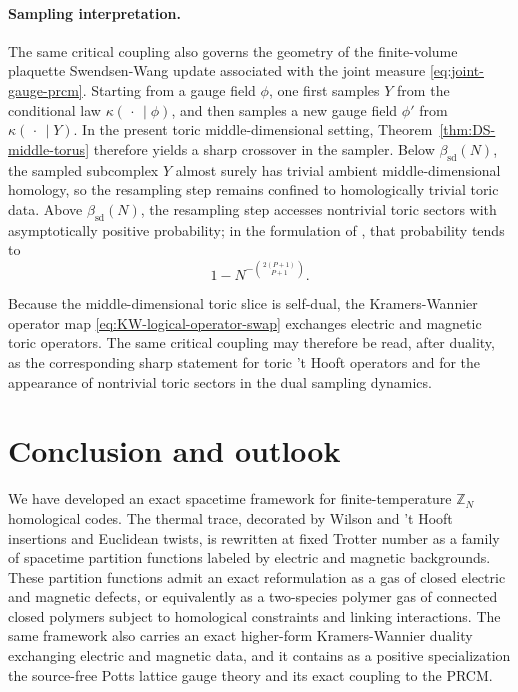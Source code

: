 \paragraph{Sampling interpretation.}
The same critical coupling also governs the geometry of the finite-volume
plaquette Swendsen-Wang update \cite{SwendsenWang87} associated with the joint measure
\eqref{eq:joint-gauge-prcm}. Starting from a gauge field \(\phi\), one first
samples \(Y\) from the conditional law \(\kappa(\,\cdot\,\mid \phi)\), and then
samples a new gauge field \(\phi'\) from \(\kappa(\,\cdot\,\mid Y)\). In the
present toric middle-dimensional setting, Theorem~\ref{thm:DS-middle-torus}
therefore yields a sharp crossover in the sampler. Below
\(\beta_{\mathrm{sd}}(N)\), the sampled subcomplex \(Y\) almost surely has
trivial ambient middle-dimensional homology, so the resampling step remains
confined to homologically trivial toric data. Above
\(\beta_{\mathrm{sd}}(N)\), the resampling step accesses nontrivial toric
sectors with asymptotically positive probability; in the formulation of
\cite[\S5.1]{DuncanSchweinhartTopological}, that probability tends to
\begin{equation}
	1-N^{-\binom{2(P+1)}{P+1}}.
	\label{eq:nonlocal-move-probability}
\end{equation}

Because the middle-dimensional toric slice is self-dual, the
Kramers-Wannier operator map \eqref{eq:KW-logical-operator-swap} exchanges
electric and magnetic toric operators. The same critical coupling may therefore
be read, after duality, as the corresponding sharp statement for toric 't Hooft
operators and for the appearance of nontrivial toric sectors in the dual
sampling dynamics.






\section{Conclusion and outlook}
\label{sec:conclusion}

We have developed an exact spacetime framework for finite-temperature
\(\mathbb Z_N\) homological codes.  The thermal trace, decorated by Wilson and
't Hooft insertions and Euclidean twists, is rewritten at fixed Trotter number
as a family of spacetime partition functions labeled by electric and magnetic
backgrounds.  These partition functions admit an exact reformulation as a gas of closed
electric and magnetic defects, or equivalently as a two-species polymer gas of
connected closed polymers subject to homological constraints and linking
interactions.  The same framework also carries an exact higher-form
Kramers-Wannier duality exchanging electric and magnetic data, and it contains
as a positive specialization the source-free Potts lattice gauge theory and its
exact coupling to the PRCM.

